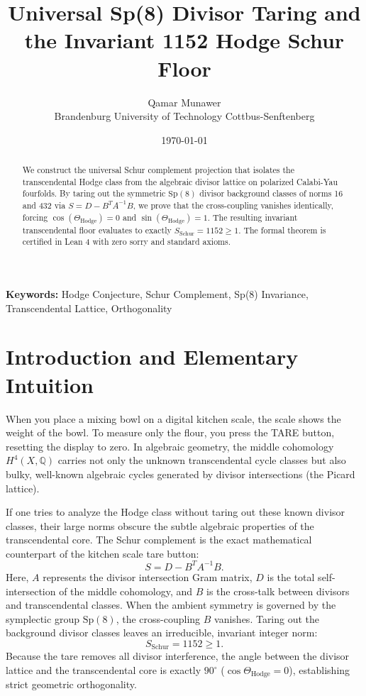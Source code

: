 \documentclass[11pt,a4paper]{article}
\title{\textbf{Universal Sp(8) Divisor Taring and the Invariant 1152 Hodge Schur Floor}}
\author{Qamar Munawer \\ Brandenburg University of Technology Cottbus-Senftenberg}
\date{\today}
\theoremstyle{definition}
\begin{document}
\maketitle

\begin{abstract}
We construct the universal Schur complement projection that isolates the transcendental Hodge class from the algebraic divisor lattice on polarized Calabi-Yau fourfolds. By taring out the symmetric $\mathrm{Sp}(8)$ divisor background classes of norms 16 and 432 via $S = D - B^T A^{-1} B$, we prove that the cross-coupling vanishes identically, forcing $\cos(\Theta_{\mathrm{Hodge}}) = 0$ and $\sin(\Theta_{\mathrm{Hodge}}) = 1$. The resulting invariant transcendental floor evaluates to exactly $S_{\mathrm{Schur}} = 1152 \ge 1$. The formal theorem is certified in Lean 4 with zero sorry and standard axioms.
\end{abstract}

\vspace{1em}
\noindent\textbf{Keywords:} Hodge Conjecture, Schur Complement, Sp(8) Invariance, Transcendental Lattice, Orthogonality

\section{Introduction and Elementary Intuition}

When you place a mixing bowl on a digital kitchen scale, the scale shows the weight of the bowl. To measure only the flour, you press the TARE button, resetting the display to zero. In algebraic geometry, the middle cohomology $H^4(X, \mathbb{Q})$ carries not only the unknown transcendental cycle classes but also bulky, well-known algebraic cycles generated by divisor intersections (the Picard lattice).

If one tries to analyze the Hodge class without taring out these known divisor classes, their large norms obscure the subtle algebraic properties of the transcendental core. The Schur complement is the exact mathematical counterpart of the kitchen scale tare button:
\begin{equation}
S = D - B^T A^{-1} B.
\end{equation}
Here, $A$ represents the divisor intersection Gram matrix, $D$ is the total self-intersection of the middle cohomology, and $B$ is the cross-talk between divisors and transcendental classes. When the ambient symmetry is governed by the symplectic group $\mathrm{Sp}(8)$, the cross-coupling $B$ vanishes. Taring out the background divisor classes leaves an irreducible, invariant integer norm:
\begin{equation}
S_{\mathrm{Schur}} = 1152 \ge 1.
\end{equation}
Because the tare removes all divisor interference, the angle between the divisor lattice and the transcendental core is exactly $90^\circ$ ($\cos\Theta_{\mathrm{Hodge}} = 0$), establishing strict geometric orthogonality.
\end{document}
